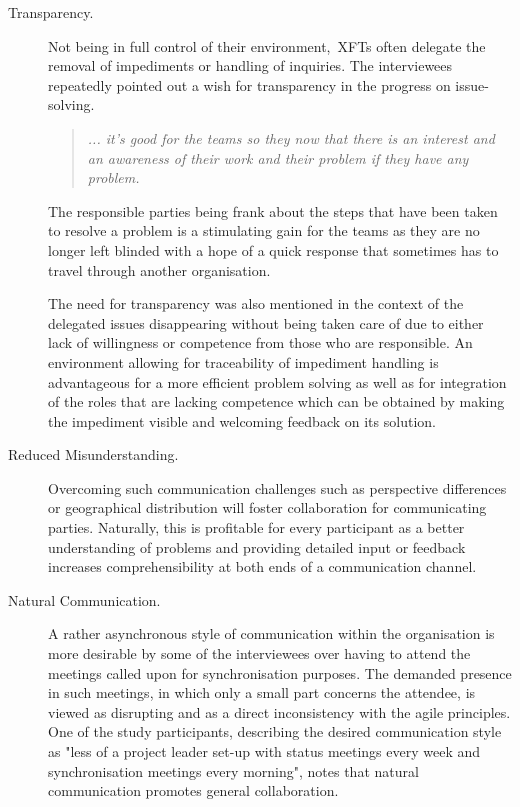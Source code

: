 \begin{description}

   \item[Transparency.] Not being in full control of their environment,~\acp{XFT} often delegate the removal of impediments or handling of inquiries. The interviewees repeatedly pointed out a wish for transparency in the progress on issue-solving.
   
   \begin{quote} \itshape... it's good for the teams so they now that there is an interest and an awareness of their work and their problem if they have any problem.
   \end{quote}
   
   The responsible parties being frank about the steps that have been taken to resolve a problem is a stimulating gain for the teams as they are no longer left blinded with a hope of a quick response that sometimes has to travel through another organisation.
   
The need for transparency was also mentioned in the context of the delegated issues disappearing without being taken care of due to either lack of willingness or competence from those who are responsible. An environment allowing for traceability of impediment handling is advantageous for a more efficient problem solving as well as for integration of the roles that are lacking competence which can be obtained by making the impediment visible and welcoming feedback on its solution.

   \item[Reduced Misunderstanding.] Overcoming such communication challenges such as perspective differences or geographical distribution will foster collaboration for communicating parties. Naturally, this is profitable for every participant as a better understanding of problems and providing detailed input or feedback increases comprehensibility at both ends of a communication channel.

   \item[Natural Communication.] A rather asynchronous style of communication within the organisation is more desirable by some of the interviewees over having to attend the meetings called upon for synchronisation purposes. The demanded presence in such meetings, in which only a small part concerns the attendee, is viewed as disrupting and as a direct inconsistency with the agile principles. One of the study participants, describing the desired communication style as "less of a project leader set-up with status meetings every week and synchronisation meetings every morning", notes that natural communication promotes general collaboration.
   

\end{description}
